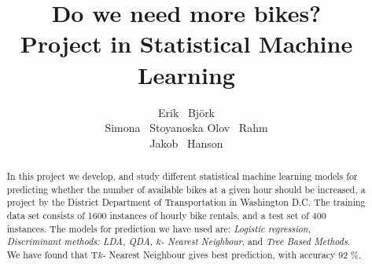 \documentclass{article}
\title{Do we need more bikes?\\
Project in Statistical Machine Learning}
\author{
  Erik ~Björk\\
  \AND
  Simona ~Stoyanoska
  \AND
  Olov ~Rahm\\
  \AND
  Jakob ~Hanson\\
}
\begin{document}
\maketitle

\begin{abstract}
  In this project we develop, and study different statistical machine learning models for predicting whether the number of available bikes at a given hour should be increased, a project by the District Department of Transportation in Washington D.C. The training data set consists of 1600 instances of hourly bike rentals, and a test set of 400 instances. The models for prediction we have used are: \emph{Logistic regression, Discriminant methods: LDA, QDA, $k$- Nearest Neighbour}, and \emph{Tree Based Methods}. We have found that T$k$- Nearest Neighbour gives best prediction, with accuracy 92 \%.
\end{abstract}

%






\appendix


\end{document}
